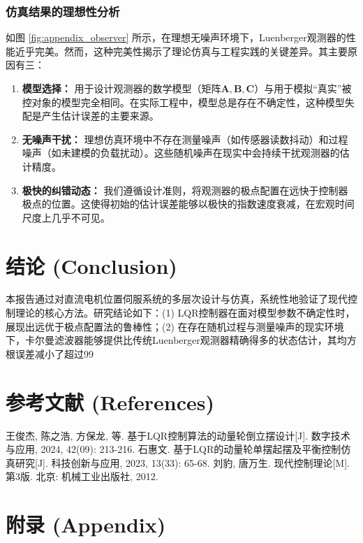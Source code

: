 \documentclass[12pt, a4paper]{article}
\begin{document}
\subsubsection{仿真结果的理想性分析}
如图 \ref{fig:appendix_observer} 所示，在理想无噪声环境下，Luenberger观测器的性能近乎完美。然而，这种完美性揭示了理论仿真与工程实践的关键差异。其主要原因有三：
\begin{enumerate}
    \item \textbf{模型选择：} 用于设计观测器的数学模型（矩阵$\bm{A}, \bm{B}, \bm{C}$）与用于模拟“真实”被控对象的模型完全相同。在实际工程中，模型总是存在不确定性，这种模型失配是产生估计误差的主要来源。
    \item \textbf{无噪声干扰：} 理想仿真环境中不存在测量噪声（如传感器读数抖动）和过程噪声（如未建模的负载扰动）。这些随机噪声在现实中会持续干扰观测器的估计精度。
    \item \textbf{极快的纠错动态：} 我们遵循设计准则，将观测器的极点配置在远快于控制器极点的位置。这使得初始的估计误差能够以极快的指数速度衰减，在宏观时间尺度上几乎不可见。
\end{enumerate}

\section{结论 (Conclusion)}
本报告通过对直流电机位置伺服系统的多层次设计与仿真，系统性地验证了现代控制理论的核心方法。研究结论如下：(1) LQR控制器在面对模型参数不确定性时，展现出远优于极点配置法的鲁棒性；(2) 在存在随机过程与测量噪声的现实环境下，卡尔曼滤波器能够提供比传统Luenberger观测器精确得多的状态估计，其均方根误差减小了超过99%

\section{参考文献 (References)}
\begin{thebibliography}{9}
     王俊杰, 陈之浩, 方保龙, 等. 基于LQR控制算法的动量轮倒立摆设计[J]. 数字技术与应用, 2024, 42(09): 213-216.
     石惠文. 基于LQR的动量轮单摆起摆及平衡控制仿真研究[J]. 科技创新与应用, 2023, 13(33): 65-68.
     刘豹, 唐万生. 现代控制理论[M]. 第3版. 北京: 机械工业出版社, 2012.
\end{thebibliography}

\appendix
\section{附录 (Appendix)}
\end{document}
